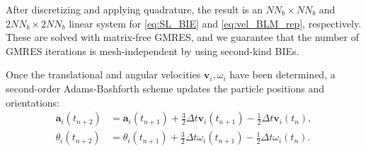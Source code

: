 \documentclass[aps,prl,preprint,groupedaddress]{revtex4-2}
\renewcommand{\aa}{\mathbf{a}}
\renewcommand{\vv}{\mathbf{v}}
\begin{document}
After discretizing and applying quadrature,
the result is an $NN_b \times NN_b$ and $2NN_b \times 2NN_b$
linear system for \eqref{eq:SL_BIE} and \eqref{eq:vel_BLM_rep}, respectively.
These are solved with matrix-free GMRES, and we guarantee that the number of
GMRES iterations is mesh-independent by using second-kind BIEs.

Once the translational and angular velocities $\vv_i, \omega_i$
have been determined, a second-order Adams-Bashforth scheme updates the particle
positions and orientations:
\begin{equation}
  \label{eq:adams-bashforth}
  \begin{aligned}
    \aa_i(t_{n+2}) &=
\aa_i(t_{n+1})
+ \tfrac{3}{2}\Delta t \vv_i(t_{n+1})
- \tfrac{1}{2}\Delta t \vv_i(t_{n}),\\
    \theta_i(t_{n+2}) &=
\theta_i(t_{n+1})
+ \tfrac{3}{2}\Delta t \omega_i(t_{n+1})
- \tfrac{1}{2}\Delta t \omega_i(t_{n}).
  \end{aligned}
\end{equation}
\end{document}
